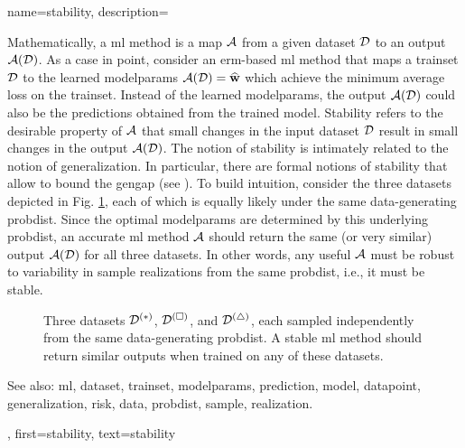 {name={stability},
	description={
	Mathematically, a \gls{ml} method is a map $\mathcal{A}$ from a given \gls{dataset} $\mathcal{D}$ 
	to an output $\mathcal{A}(\mathcal{D})$. As a case in point, consider an \gls{erm}-based 
	\gls{ml} method that maps a \gls{trainset} $\mathcal{D}$ to the learned \gls{modelparams} 
	$\mathcal{A}(\mathcal{D}) = \widehat{{\bf w}}$ which achieve the minimum average \gls{loss} 
	on the \gls{trainset}. Instead of the learned \gls{modelparams}, the 
	output $\mathcal{A}(\mathcal{D})$ could also be the \glspl{prediction} obtained from 
	the trained \gls{model}. Stability refers to the desirable property 
	of $\mathcal{A}$ that small changes in the input \gls{dataset} $\mathcal{D}$ result in small 
	changes in the output $\mathcal{A}(\mathcal{D})$. The notion of stability is intimately related 
	to the notion of \gls{generalization}. In particular, there are formal notions of stability  
	that allow to bound the \gls{gengap} (see \cite[Ch.~13]{ShalevMLBook}).
		To build intuition, consider the three \glspl{dataset} depicted in Fig. \ref{fig_three_data_stability_dict}, each 
		of which is equally likely under the same \gls{data}-generating \gls{probdist}. Since the 
		optimal \gls{modelparams} are determined by this underlying \gls{probdist}, an accurate 
		\gls{ml} method $\mathcal{A}$ should return the same (or very similar) output $\mathcal{A}(\mathcal{D})$ 
		for all three \glspl{dataset}. In other words, any useful $\mathcal{A}$ must be robust to 
		variability in \gls{sample} \glspl{realization} from the same \gls{probdist}, i.e., it must be stable. 
		\begin{figure}[H]
			\centering
			\caption{Three \glspl{dataset} $\mathcal{D}^{(*)}$, $\mathcal{D}^{(\square)}$, 
			and $\mathcal{D}^{(\triangle)}$, each sampled independently from the same 
			\gls{data}-generating \gls{probdist}. A stable \gls{ml} method should return 
			similar outputs when trained on any of these \glspl{dataset}. \label{fig_three_data_stability_dict}}
		\end{figure}
		See also: \gls{ml}, \gls{dataset}, \gls{trainset}, \gls{modelparams}, \gls{prediction}, \gls{model}, \gls{datapoint}, \gls{generalization}, \gls{risk}, \gls{data}, \gls{probdist}, \gls{sample}, \gls{realization}.}, 
	first={stability}, 
	text={stability} 
}


